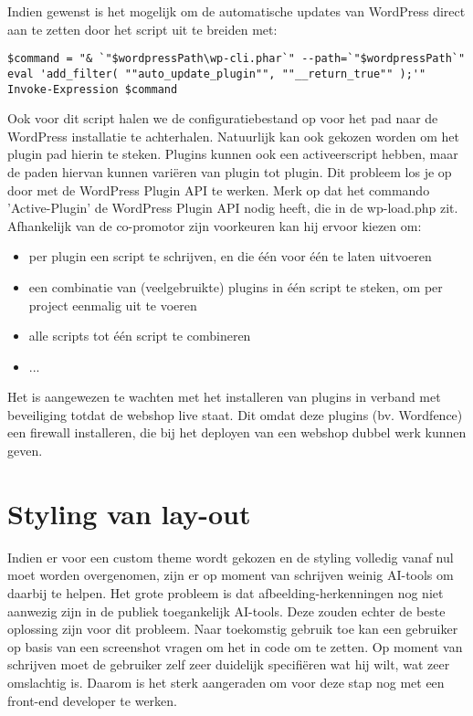 Indien gewenst is het mogelijk om de automatische updates van WordPress direct aan te zetten door het script uit te breiden met:
\begin{verbatim}
$command = "& `"$wordpressPath\wp-cli.phar`" --path=`"$wordpressPath`" eval 'add_filter( ""auto_update_plugin"", ""__return_true"" );'"
Invoke-Expression $command
\end{verbatim}
Ook voor dit script halen we de configuratiebestand op voor het pad naar de WordPress installatie te achterhalen. Natuurlijk kan ook gekozen worden om het plugin pad hierin te steken. Plugins kunnen ook een activeerscript hebben, maar de paden hiervan kunnen variëren van plugin tot plugin. Dit probleem los je op door met de WordPress Plugin API te werken. Merk op dat het commando 'Active-Plugin' de WordPress Plugin API nodig heeft, die in de wp-load.php zit. Afhankelijk van de co-promotor zijn voorkeuren kan hij ervoor kiezen om:
\begin{itemize}
    \item per plugin een script te schrijven, en die één voor één te laten uitvoeren
    \item een combinatie van (veelgebruikte) plugins in één script te steken, om per project eenmalig uit te voeren
    \item alle scripts tot één script te combineren
    \item ...
\end{itemize} 
Het is aangewezen te wachten met het installeren van plugins in verband met beveiliging totdat de webshop live staat. Dit omdat deze plugins (bv. Wordfence) een firewall installeren, die bij het deployen van een webshop dubbel werk kunnen geven.
\section{Styling van lay-out}
Indien er voor een custom theme wordt gekozen en de styling volledig vanaf nul moet worden overgenomen, zijn er op moment van schrijven weinig AI-tools om daarbij te helpen. Het grote probleem is dat afbeelding-herkenningen nog niet aanwezig zijn in de publiek toegankelijk AI-tools. Deze zouden echter de beste oplossing zijn voor dit probleem. Naar toekomstig gebruik toe kan een gebruiker op basis van een screenshot vragen om het in code om te zetten. Op moment van schrijven moet de gebruiker zelf zeer duidelijk specifiëren wat hij wilt, wat zeer omslachtig is. Daarom is het sterk aangeraden om voor deze stap nog met een front-end developer te werken.

